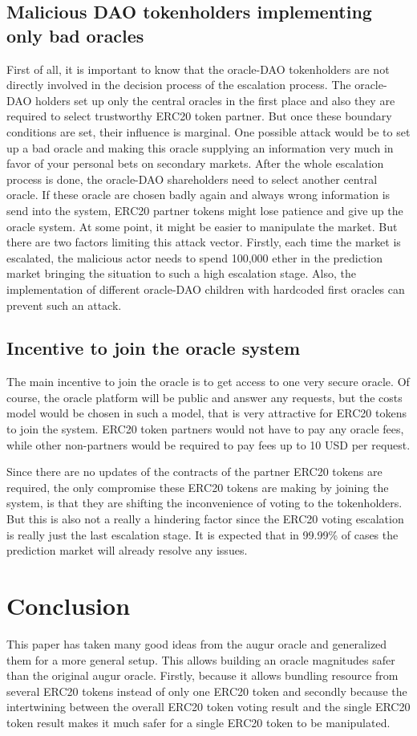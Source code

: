 \documentclass[a4paper]{article}
\begin{document}
\subsection{Malicious DAO tokenholders implementing only bad oracles}
First of all, it is important to know that the oracle-DAO tokenholders are not directly involved in the decision process of the escalation process. The oracle-DAO holders set up only the central oracles in the first place and also they are required to select trustworthy ERC20 token partner. But once these boundary conditions are set, their influence is marginal.
\label{100percentattack}One possible attack would be to set up a bad oracle and making this oracle supplying an information very much in favor of your personal bets on secondary markets. After the whole escalation process is done, the oracle-DAO shareholders need to select another central oracle. If these oracle are chosen badly again and always wrong information is send into the system, ERC20 partner tokens might lose patience and give up the oracle system. At some point, it might be easier to manipulate the market. But there are two factors limiting this attack vector. Firstly, each time the market is escalated, the malicious actor needs to spend  100,000 ether in the prediction market bringing the situation to such a high escalation stage. Also, the implementation of different oracle-DAO children with hardcoded first oracles can prevent such an attack. 
\subsection{Incentive to join the oracle system}
The main incentive to join the oracle is to get access to one very secure oracle. Of course, the oracle platform will be public and answer any requests, but the costs model would be chosen in such a model, that is very attractive for ERC20 tokens to join the system. ERC20 token partners would not have to pay any oracle fees, while other non-partners would be required to pay fees up to 10 USD per request. 

Since there are no updates of the contracts of the partner ERC20 tokens are required, the only compromise these ERC20 tokens are making by joining the system, is that they are shifting the inconvenience of voting to the tokenholders. But this is also not a really a hindering factor since the ERC20 voting escalation is really just the last escalation stage. It is expected that in 99.99\% of cases the prediction market will already resolve any issues. 
\section{Conclusion}
This paper has taken many good ideas from the augur oracle and generalized them for a more general setup. This allows building an oracle magnitudes safer than the original augur oracle. Firstly, because it allows bundling resource from several ERC20 tokens instead of only one ERC20 token and secondly because the intertwining between the overall ERC20 token voting result and the single ERC20 token result makes it much safer for a single ERC20 token to be manipulated. 
\end{document}
